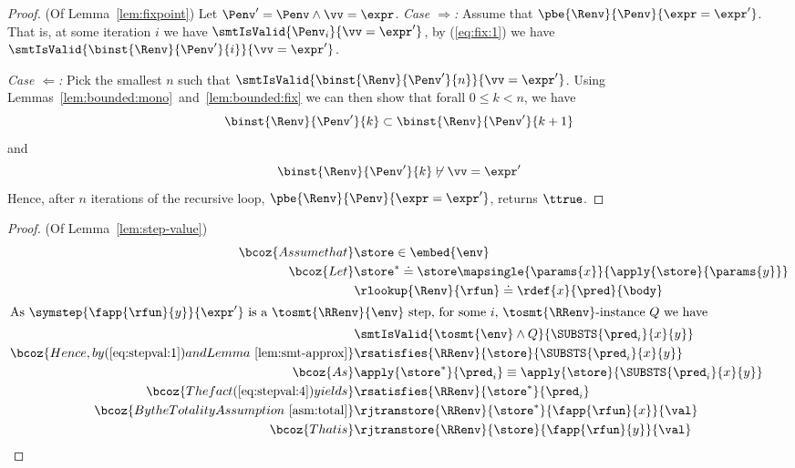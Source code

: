\begin{proof} (Of Lemma~\ref{lem:fixpoint})
Let $\Penv' = \Penv \wedge \vv = \expr$.
%
\emph{Case $\Rightarrow$:}
Assume that $\pbe{\Renv}{\Penv}{\expr = \expr'}$.
That is, at some iteration $i$ we have
$\smtIsValid{\Penv_i}{\vv = \expr'}$,
\ie by (\ref{eq:fix:1}) we have
$\smtIsValid{\binst{\Renv}{\Penv'}{i}}{\vv = \expr'}$.

\emph{Case $\Leftarrow$:}
Pick the smallest $n$ such that
$\smtIsValid{\binst{\Renv}{\Penv'}{n}}{\vv = \expr'}$.
Using Lemmas~\ref{lem:bounded:mono}~and~\ref{lem:bounded:fix}
we can then show that forall $0 \leq k < n$, we have
%
$$
\binst{\Renv}{\Penv'}{k} \subset \binst{\Renv}{\Penv'}{k+1}
$$
%
and
%
$$\binst{\Renv}{\Penv'}{k} \not \vdash {\vv = \expr'}$$
%
Hence, after $n$ iterations of the recursive loop,
$\pbe{\Renv}{\Penv}{\expr = \expr'}$, returns $\ttrue$.
\end{proof}


\begin{proof} (Of Lemma~\ref{lem:step-value})
\begin{align}%
\bcoz{Assume that}
  & \store \in \embed{\env} \label{eq:stepval:1} \\
\bcoz{Let}
  & \store^*  \doteq \store \mapsingle{\params{x}}{\apply{\store}{\params{y}}} \label{eq:stepval:2}\\
  & \rlookup{\Renv}{\rfun} \doteq \rdef{x}{\pred}{\body} \label{eq:stepval:3} \\
\intertext{As $\symstep{\fapp{\rfun}{y}}{\expr'}$ is a $\tosmt{\RRenv}{\env}$ step,
for some $i$, \tosmt{\RRenv}-instance $Q$ we have}
  & \smtIsValid{\tosmt{\env} \wedge Q}{\SUBSTS{\pred_i}{x}{y}} \notag \\
\bcoz{Hence, by (\ref{eq:stepval:1}) and Lemma~\ref{lem:smt-approx}}
  & \rsatisfies{\RRenv}{\store}{\SUBSTS{\pred_i}{x}{y}} \label{eq:stepval:4}\\
\bcoz{As}
  & \apply{\store^*}{\pred_i} \equiv \apply{\store}{\SUBSTS{\pred_i}{x}{y}} \\
\bcoz{The fact (\ref{eq:stepval:4}) yields}
  & \rsatisfies{\RRenv}{\store^*}{\pred_i} \notag \\
\bcoz{By the Totality Assumption~\ref{asm:total}}
  & \rjtranstore{\RRenv}{\store^*}{\fapp{\rfun}{x}}{\val} \notag \\
\bcoz{That is}
  & \rjtranstore{\RRenv}{\store}{\fapp{\rfun}{y}}{\val} \\
\end{align}
\end{proof}

